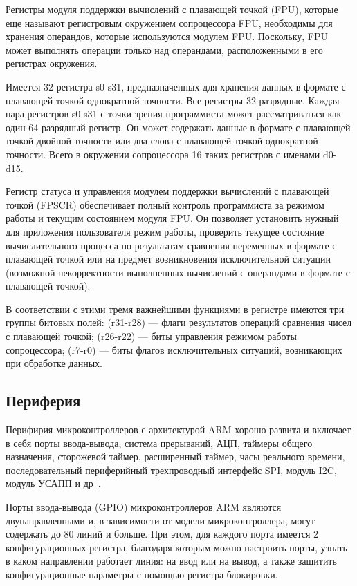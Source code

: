 \documentclass[12pt, oneside]{altsu-report}
\begin{document}
Регистры модуля поддержки вычислений с плавающей точкой (FPU), которые еще называют регистровым окружением сопроцессора FPU, необходимы для хранения операндов, которые используются модулем FPU. Поскольку, FPU может выполнять операции только над операндами, расположенными в его регистрах окружения. 

Имеется 32 регистра s0-s31, предназначенных для хранения данных в формате с плавающей точкой однократной точности. Все регистры 32-разрядные. Каждая пара регистров s0-s31 с точки зрения программиста может рассматриваться как один 64-разрядный регистр. Он может содержать данные в формате с плавающей точкой двойной точности или два слова с плавающей точкой однократной точности. Всего в окружении сопроцессора 16 таких регистров с именами d0-d15.

Регистр статуса и управления модулем поддержки вычислений с плавающей точкой (FPSCR) обеспечивает полный контроль программиста за режимом работы и текущим состоянием модуля FPU. Он позволяет установить нужный для приложения пользователя режим работы, проверить текущее состояние вычислительного процесса по результатам сравнения переменных в формате с плавающей точкой или на предмет возникновения исключительной ситуации (возможной некорректности выполненных вычислений с операндами в формате с плавающей точкой).

В соответствии с этими тремя важнейшими функциями в регистре имеются три группы битовых полей: (r31-r28) --- флаги результатов операций сравнения чисел с  плавающей точкой; (r26-r22) –-- биты управления режимом работы сопроцессора; (r7-r0) --- биты флагов исключительных ситуаций, возникающих при обработке данных.

\subsection{Периферия}

Перифирия микроконтроллеров с архитектурой ARM хорошо развита и включает в себя порты ввода-вывода, система прерываний, АЦП, таймеры общего назначения, сторожевой таймер, расширенный таймер, часы реального времени, последовательный периферийный трехпроводный интерфейс SPI, модуль I2C, модуль УСАПП и др~\cite{ARM-M3}.

Порты ввода-вывода (GPIO) микроконтроллеров ARM являются двунаправленными и, в зависимости от модели микроконтроллера, могут содержать до 80 линий и больше. При этом, для каждого порта имеется 2 конфигурационных регистра, благодаря которым можно настроить порты, узнать в каком направлении работает линия: на ввод или на вывод, а также защитить конфигурационные параметры с помощью регистра блокировки.
\end{document}
